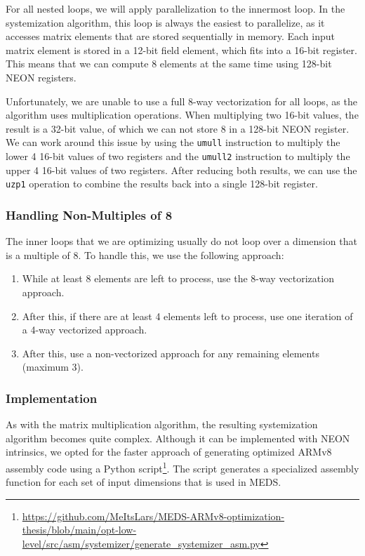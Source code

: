 \documentclass[11pt,a4paper]{report}
\theoremstyle{definition}
\begin{document}
For all nested loops, we will apply parallelization to the innermost loop. In the systemization algorithm, this loop is always the easiest to parallelize, as it accesses matrix elements that are stored sequentially in memory. Each input matrix element is stored in a 12-bit field element, which fits into a 16-bit register. This means that we can compute 8 elements at the same time using 128-bit NEON registers.

Unfortunately, we are unable to use a full 8-way vectorization for all loops, as the algorithm uses multiplication operations. When multiplying two 16-bit values, the result is a 32-bit value, of which we can not store 8 in a 128-bit NEON register. We can work around this issue by using the \texttt{umull} instruction to multiply the lower 4 16-bit values of two registers and the \texttt{umull2} instruction to multiply the upper 4 16-bit values of two registers. After reducing both results, we can use the \texttt{uzp1} operation to combine the results back into a single 128-bit register.

\subsubsection{Handling Non-Multiples of 8}
\label{sec:matrixsystemizationnonmultiples}
The inner loops that we are optimizing usually do not loop over a dimension that is a multiple of 8. To handle this, we use the following approach:
\begin{enumerate}
  \item While at least 8 elements are left to process, use the 8-way vectorization approach.
  \item After this, if there are at least 4 elements left to process, use one iteration of a 4-way vectorized approach.
  \item After this, use a non-vectorized approach for any remaining elements (maximum 3).
\end{enumerate}

\subsubsection{Implementation}
As with the matrix multiplication algorithm, the resulting systemization algorithm becomes quite complex. Although it can be implemented with NEON intrinsics, we opted for the faster approach of generating optimized ARMv8 assembly code using a Python script\footnote{\url{https://github.com/MeItsLars/MEDS-ARMv8-optimization-thesis/blob/main/opt-low-level/src/asm/systemizer/generate\_systemizer\_asm.py}}. The script generates a specialized assembly function for each set of input dimensions that is used in MEDS.
\end{document}
